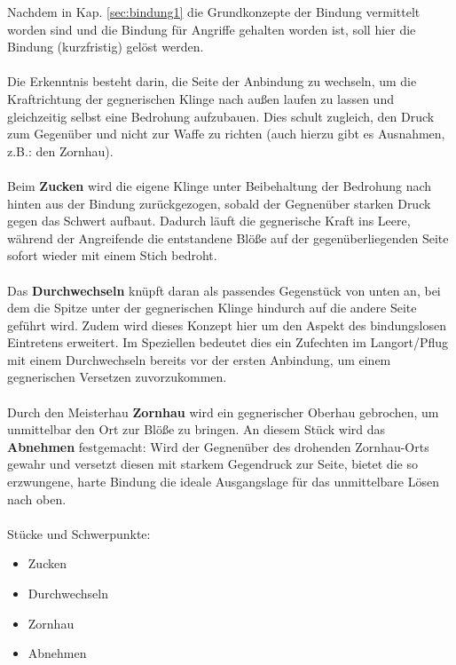 Nachdem in Kap. \ref{sec:bindung1} die Grundkonzepte der Bindung vermittelt worden sind und die Bindung für Angriffe gehalten worden ist, soll hier die Bindung (kurzfristig) gelöst werden.
\\
\\
Die Erkenntnis besteht darin, die Seite der Anbindung zu wechseln, um die Kraftrichtung der gegnerischen Klinge nach außen laufen zu lassen und gleichzeitig selbst eine Bedrohung aufzubauen.
Dies schult zugleich, den Druck zum Gegenüber und nicht zur Waffe zu richten (auch hierzu gibt es Ausnahmen, z.B.: den Zornhau).
\\
\\
Beim \textbf{Zucken} wird die eigene Klinge unter Beibehaltung der Bedrohung nach hinten aus der Bindung zurückgezogen, sobald der Gegnenüber starken Druck gegen das Schwert aufbaut. Dadurch läuft die gegnerische Kraft ins Leere, während der Angreifende die entstandene Blöße auf der gegenüberliegenden Seite sofort wieder mit einem Stich bedroht.
\\
\\
Das \textbf{Durchwechseln} knüpft daran als passendes Gegenstück von unten an, bei dem die Spitze unter der gegnerischen Klinge hindurch auf die andere Seite geführt wird. Zudem wird dieses Konzept hier um den Aspekt des bindungslosen Eintretens erweitert. Im Speziellen bedeutet dies ein Zufechten im Langort/Pflug mit einem Durchwechseln bereits vor der ersten Anbindung, um einem gegnerischen Versetzen zuvorzukommen.
\\
\\
Durch den Meisterhau \textbf{Zornhau} wird ein gegnerischer Oberhau gebrochen, um unmittelbar den Ort zur Blöße zu bringen. An diesem Stück wird das \textbf{Abnehmen} festgemacht: Wird der Gegnenüber des drohenden Zornhau-Orts gewahr und versetzt diesen mit starkem Gegendruck zur Seite, bietet die so erzwungene, harte Bindung die ideale Ausgangslage für das unmittelbare Lösen nach oben.
\\
\\
Stücke und Schwerpunkte:

\begin{itemize}
    \item Zucken
    \item Durchwechseln
    \item Zornhau
    \item Abnehmen
\end{itemize}

\newpage

